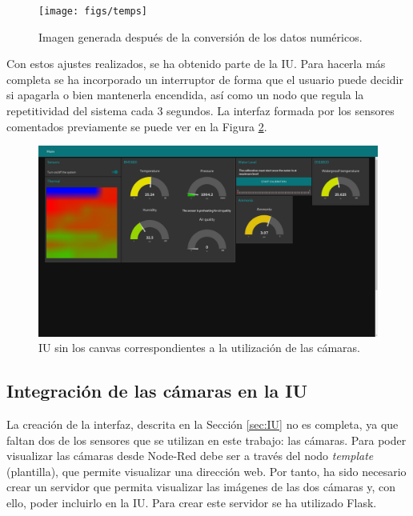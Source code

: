  \begin{figure} [h!]
  \begin{center}
    \texttt{[image: figs/temps]}
  \end{center}
  \caption{Imagen generada después de la conversión de los datos numéricos.}
  \label{fig:temps}
\end{figure}

Con estos ajustes realizados, se ha obtenido parte de la IU. Para hacerla más completa se ha incorporado un interruptor de forma que el usuario puede decidir si apagarla o bien mantenerla encendida, así como un nodo que regula la repetitividad del sistema cada 3 segundos. La interfaz formada por los sensores comentados previamente se puede ver en la Figura \ref{fig:ui_nocams}.
\begin{figure} [h!]
  \begin{center}
    \includegraphics[width=16cm]{figs/ui_nocams}
  \end{center}
  \caption{IU sin los canvas correspondientes a la utilización de las cámaras.}
  \label{fig:ui_nocams}
\end{figure}

\subsection{Integración de las cámaras en la IU}
La creación de la interfaz, descrita en la Sección \ref{sec:IU} no es completa, ya que faltan dos de los sensores que se utilizan en este trabajo: las cámaras. Para poder visualizar las cámaras desde Node-Red debe ser a través del nodo \textit{template} (plantilla), que permite visualizar una dirección web. Por tanto, ha sido necesario crear un servidor que permita visualizar las imágenes de las dos cámaras y, con ello, poder incluirlo en la IU. Para crear este servidor se ha utilizado Flask.\\

